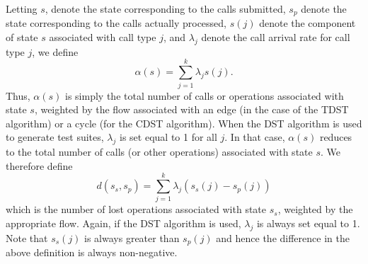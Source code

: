 \documentclass[journal, twoside]{IEEEtran}
\begin{document}
Letting $s$, denote the state corresponding to the calls submitted, $s_p$ denote the state corresponding to the calls actually
processed, $s(j)$ denote the component of state $s$ associated with
call type $j$, and $\lambda_j$ denote the call arrival rate for call type $j$, we
define 
\begin{equation}
    \alpha(s)= \sum_{j=1}^{k} \lambda_j s(j).
\end{equation}
Thus, $\alpha(s)$  is simply the total number of calls or operations
associated with state $s$, weighted by the flow associated with
an edge (in the case of the TDST algorithm) or a cycle (for the
CDST algorithm). When the DST algorithm is used to generate test suites, $\lambda_j$ is set equal to 1 for all $j$. In that case, $\alpha(s)$
reduces to the total number of calls (or other operations) associated with state $s$. We therefore define  
\begin{equation}
    d(s_s,s_p)=\sum_{j=1}^{k} \lambda_j(s_s(j) - s_p(j) )
\end{equation}
which is the number of lost operations associated with state $s_s$,
weighted by the appropriate flow. Again, if the DST algorithm
is used, $\lambda_j$ is always set equal to 1. Note that $s_s(j)$ is always
greater than $s_p(j)$ and hence the difference in the above definition is always non-negative. 
\end{document}
